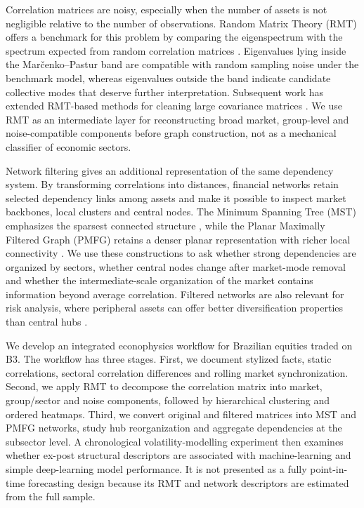 Correlation matrices are noisy, especially when the number of assets is not negligible relative to the number of observations. Random Matrix Theory (RMT) offers a benchmark for this problem by comparing the eigenspectrum with the spectrum expected from random correlation matrices \cite{marcenko_1967_distribution,laloux_1999_noise,plerou_2002_random}. Eigenvalues lying inside the Mar\v{c}enko--Pastur band are compatible with random sampling noise under the benchmark model, whereas eigenvalues outside the band indicate candidate collective modes that deserve further interpretation. Subsequent work has extended RMT-based methods for cleaning large covariance matrices \cite{bun_2017_cleaning}. We use RMT as an intermediate layer for reconstructing broad market, group-level and noise-compatible components before graph construction, not as a mechanical classifier of economic sectors.

Network filtering gives an additional representation of the same dependency system. By transforming correlations into distances, financial networks retain selected dependency links among assets and make it possible to inspect market backbones, local clusters and central nodes. The Minimum Spanning Tree (MST) emphasizes the sparsest connected structure \cite{mantegna_1999_hierarchical}, while the Planar Maximally Filtered Graph (PMFG) retains a denser planar representation with richer local connectivity \cite{tumminello_2005_tool,tumminello_2010_correlation}. We use these constructions to ask whether strong dependencies are organized by sectors, whether central nodes change after market-mode removal and whether the intermediate-scale organization of the market contains information beyond average correlation. Filtered networks are also relevant for risk analysis, where peripheral assets can offer better diversification properties than central hubs \cite{pozzi_2013_spread,aste_2010_correlation}.

We develop an integrated econophysics workflow for Brazilian equities traded on B3. The workflow has three stages. First, we document stylized facts, static correlations, sectoral correlation differences and rolling market synchronization. Second, we apply RMT to decompose the correlation matrix into market, group/sector and noise components, followed by hierarchical clustering and ordered heatmaps. Third, we convert original and filtered matrices into MST and PMFG networks, study hub reorganization and aggregate dependencies at the subsector level. A chronological volatility-modelling experiment then examines whether ex-post structural descriptors are associated with machine-learning and simple deep-learning model performance. It is not presented as a fully point-in-time forecasting design because its RMT and network descriptors are estimated from the full sample.


